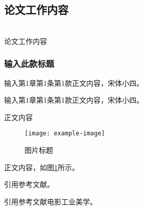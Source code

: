                 
\subsection{论文工作内容} %

    ~\\
    
    论文工作内容

    \subsubsection{输入此款标题} %

        输入第1章第1条第1款正文内容，宋体小四。


            输入第1章第1条第1款正文内容，宋体小四。

        正文内容

        \begin{figure}[ht]
            \centering
            \texttt{[image: example-image]} 
            \caption{图片标题\protect} %
            \label{img} 
        \end{figure}
        
        
            



        正文内容，如图\ref{img}所示。
    
        引用参考文献。

        引用参考文献电影工业美学\cite{电影工业美学}。
        






